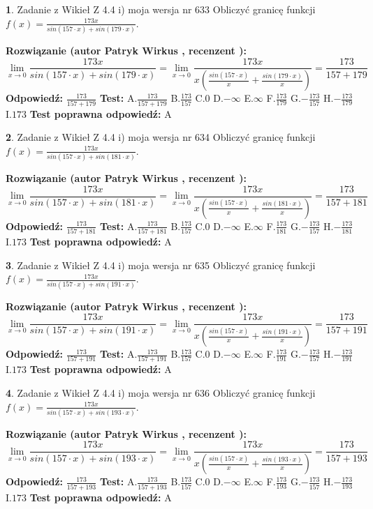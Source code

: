 \documentclass[12pt, a4paper]{article}
\theoremstyle{definition} %
\newtheorem{zad}{}
\newcommand{\zadStart}[1]{\begin{zad}#1\newline}
\newcommand{\zadStop}{\end{zad}}
\newcommand{\rozwStart}[2]{\noindent \textbf{Rozwiązanie (autor #1 , recenzent #2): }\newline}
\newcommand{\rozwStop}{\newline}
\newcommand{\odpStart}{\noindent \textbf{Odpowiedź:}\newline}
\newcommand{\odpStop}{\newline}
\newcommand{\testStart}{\noindent \textbf{Test:}\newline}
\newcommand{\testStop}{\newline}
\newcommand{\kluczStart}{\noindent \textbf{Test poprawna odpowiedź:}\newline}
\newcommand{\kluczStop}{\newline}
\begin{document}
\zadStart{Zadanie z Wikieł Z 4.4 i) moja wersja nr 633}
Obliczyć granicę funkcji $f(x)=\frac{173x}{sin(157\cdot x) +sin(179\cdot x)}$.
\zadStop
\rozwStart{Patryk Wirkus}{}
$$\lim\limits_{x\to 0}\frac{173x}{sin(157\cdot x) +sin(179\cdot x)}=\lim\limits_{x\to 0}\frac{173x}{x(\frac{sin(157\cdot x)}{x}+\frac{sin(179\cdot x)}{x})}=\frac{173}{157+179}$$
\rozwStop
\odpStart
$\frac{173}{157+179}$
\odpStop
\testStart
A.$\frac{173}{157+179}$
B.$\frac{173}{157}$
C.$0$
D.$-\infty$
E.$\infty$
F.$\frac{173}{179}$
G.$-\frac{173}{157}$
H.$-\frac{173}{179}$
I.$173$
\testStop
\kluczStart
A
\kluczStop



\zadStart{Zadanie z Wikieł Z 4.4 i) moja wersja nr 634}
Obliczyć granicę funkcji $f(x)=\frac{173x}{sin(157\cdot x) +sin(181\cdot x)}$.
\zadStop
\rozwStart{Patryk Wirkus}{}
$$\lim\limits_{x\to 0}\frac{173x}{sin(157\cdot x) +sin(181\cdot x)}=\lim\limits_{x\to 0}\frac{173x}{x(\frac{sin(157\cdot x)}{x}+\frac{sin(181\cdot x)}{x})}=\frac{173}{157+181}$$
\rozwStop
\odpStart
$\frac{173}{157+181}$
\odpStop
\testStart
A.$\frac{173}{157+181}$
B.$\frac{173}{157}$
C.$0$
D.$-\infty$
E.$\infty$
F.$\frac{173}{181}$
G.$-\frac{173}{157}$
H.$-\frac{173}{181}$
I.$173$
\testStop
\kluczStart
A
\kluczStop



\zadStart{Zadanie z Wikieł Z 4.4 i) moja wersja nr 635}
Obliczyć granicę funkcji $f(x)=\frac{173x}{sin(157\cdot x) +sin(191\cdot x)}$.
\zadStop
\rozwStart{Patryk Wirkus}{}
$$\lim\limits_{x\to 0}\frac{173x}{sin(157\cdot x) +sin(191\cdot x)}=\lim\limits_{x\to 0}\frac{173x}{x(\frac{sin(157\cdot x)}{x}+\frac{sin(191\cdot x)}{x})}=\frac{173}{157+191}$$
\rozwStop
\odpStart
$\frac{173}{157+191}$
\odpStop
\testStart
A.$\frac{173}{157+191}$
B.$\frac{173}{157}$
C.$0$
D.$-\infty$
E.$\infty$
F.$\frac{173}{191}$
G.$-\frac{173}{157}$
H.$-\frac{173}{191}$
I.$173$
\testStop
\kluczStart
A
\kluczStop



\zadStart{Zadanie z Wikieł Z 4.4 i) moja wersja nr 636}
Obliczyć granicę funkcji $f(x)=\frac{173x}{sin(157\cdot x) +sin(193\cdot x)}$.
\zadStop
\rozwStart{Patryk Wirkus}{}
$$\lim\limits_{x\to 0}\frac{173x}{sin(157\cdot x) +sin(193\cdot x)}=\lim\limits_{x\to 0}\frac{173x}{x(\frac{sin(157\cdot x)}{x}+\frac{sin(193\cdot x)}{x})}=\frac{173}{157+193}$$
\rozwStop
\odpStart
$\frac{173}{157+193}$
\odpStop
\testStart
A.$\frac{173}{157+193}$
B.$\frac{173}{157}$
C.$0$
D.$-\infty$
E.$\infty$
F.$\frac{173}{193}$
G.$-\frac{173}{157}$
H.$-\frac{173}{193}$
I.$173$
\testStop
\kluczStart
A
\kluczStop
\end{document}
